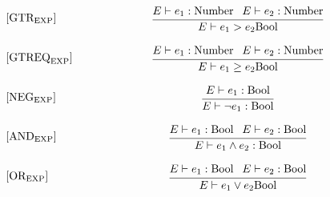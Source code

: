 \begin{equation}
\begin{minipage}{.2\linewidth}
$[\text{GTR}_\text{EXP}]$ 
\end{minipage}
\begin{minipage}{.8\linewidth}
\centering
$\cfrac{E \vdash e_1 : \text{Number } \: \: E \vdash e_2 : \text{Number}}{E \vdash e_1 > e_2  \text{Bool}}$
\end{minipage}
\end{equation}

\begin{equation}
\begin{minipage}{.2\linewidth}
$[\text{GTREQ}_\text{EXP}]$ 
\end{minipage}
\begin{minipage}{.8\linewidth}
\centering
$\cfrac{E \vdash e_1 : \text{Number } \: \: E \vdash e_2 : \text{Number}}{E \vdash e_1 \geq e_2  \text{Bool}}$
\end{minipage}
\end{equation}

\begin{equation}
\begin{minipage}{.2\linewidth}
$[\text{NEG}_\text{EXP}]$ 
\end{minipage}
\begin{minipage}{.8\linewidth}
\centering
$\cfrac{E \vdash e_1 : \text{Bool}}{E \vdash \neg e_1 : \text{Bool}}$
\end{minipage}
\end{equation}

\begin{equation}
\begin{minipage}{.2\linewidth}
$[\text{AND}_\text{EXP}]$ 
\end{minipage}
\begin{minipage}{.8\linewidth}
\centering
$\cfrac{E \vdash e_1 : \text{Bool } \: \: E \vdash e_2 : \text{Bool}}{E \vdash e_1 \land e_2 : \text{Bool}}$
\end{minipage}
\end{equation}

\begin{equation}
\begin{minipage}{.2\linewidth}
$[\text{OR}_\text{EXP}]$ 
\end{minipage}
\begin{minipage}{.8\linewidth}
\centering
$\cfrac{E \vdash e_1 : \text{Bool } \: \: E \vdash e_2 : \text{Bool}}{E \vdash e_1 \vee e_2  \text{Bool}}$
\end{minipage}
\end{equation}

